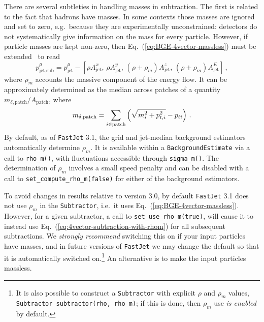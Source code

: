 \documentclass[12pt,a4]{article}
\newcommand{\fastjet}{\texttt{FastJet}\xspace}
\newcommand{\ttt}[1]{{\small\texttt{#1}}}
\begin{document}
There are several subtleties in handling masses in
subtraction. 
%
The first is related to the fact that hadrons have
masses.
%
In some contexts those masses are ignored and set to zero, e.g.\
because they are experimentally unconstrained: detectors do not
systematically give information on the mass for every particle.
%
However, if particle masses are kept non-zero, then
Eq.~(\ref{eq:BGE-4vector-massless}) must be
extended~\cite{Soyez:2012hv} to read
\begin{equation}
  \label{eq:4vector-subtraction-with-rhom}
  p^\mu_\text{jet,sub} = 
  p^\mu_\text{jet}  
  - [\rho A^x_\text{jet}, \,
     \rho A^y_\text{jet}, \,
     (\rho+\rho_m) A^z_\text{jet}, \,
     (\rho+\rho_m) A^E_\text{jet}
     ]\,,
\end{equation}
where $\rho_m$ accounts the massive component of the energy flow. 
%
It can be approximately determined as the median across patches of a
quantity $m_{\delta,\text{patch}}/A_{\text{patch}}$, where
\begin{equation}
  \label{eq:m-delta}
  m_{\delta,\text{patch}} = \sum_{i\in\text{patch}}
  \left(\sqrt{\smash[b]{m^2_{i} + p_{t,i}^2}} - p_{ti}\right)\,.
\end{equation}
By default, as of \fastjet 3.1, the grid and jet-median background
estimators automatically determine $\rho_m$. 
%
It is available within a \ttt{BackgroundEstimate} via a call to
\ttt{rho\_m()}, with fluctuations accessible through \ttt{sigma\_m()}.
%
The determination of $\rho_m$ involves a small speed penalty and can
be disabled with a call to \ttt{set\_compute\_rho\_m(false)} for
either of the background estimators.

To avoid changes in results relative to version 3.0, by default
\fastjet 3.1 does not use $\rho_m$ in the \ttt{Subtractor}, i.e.\ it
uses Eq.~(\ref{eq:BGE-4vector-massless}).
%
However, for a given subtractor, a call to
\ttt{set\_use\_rho\_m(true)}, will cause it to instead use
Eq.~(\ref{eq:4vector-subtraction-with-rhom}) for all subsequent
subtractions.
%
We \emph{strongly recommend} switching this on if your input particles
have masses, and in future versions of \fastjet we may change the
default so that it is automatically switched on.\footnote{It is also
  possible to construct a \texttt{Subtractor} with explicit $\rho$ and
  $\rho_m$ values, \texttt{Subtractor subtractor(rho, rho\_m)}; if
  this is done, then $\rho_m$ use \emph{is enabled} by default.}
%
An alternative is to make the input particles massless.
\end{document}
